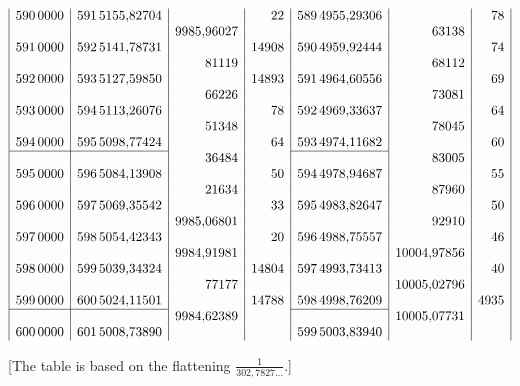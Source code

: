 {\[\begin{array}{|r|r|r|r|r|r|r|}
590\,0000&591\,5155{,}82704&&22&589\,4955{,}29306&&78\\
&&9985{,}96027&&&63138&\\
591\,0000&592\,5141{,}78731&&14908&590\,4959{,}92444&&74\\
&&81119&&&68112&\\
592\,0000&593\,5127{,}59850&&14893&591\,4964{,}60556&&69\\
&&66226&&&73081&\\
593\,0000&594\,5113{,}26076&&78&592\,4969{,}33637&&64\\
&&51348&&&78045&\\
594\,0000&595\,5098{,}77424&&64&593\,4974{,}11682&&60\\
\cline{1-2}\cline{5-5}
&&36484&&&83005&\\
595\,0000&596\,5084{,}13908&&50&594\,4978{,}94687&&55\\
&&21634&&&87960&\\
596\,0000&597\,5069{,}35542&&33&595\,4983{,}82647&&50\\
&&9985{,}06801&&&92910&\\
597\,0000&598\,5054{,}42343&&20&596\,4988{,}75557&&46\\
&&9984{,}91981&&&10004{,}97856&\\
598\,0000&599\,5039{,}34324&&14804&597\,4993{,}73413&&40\\
&&77177&&&10005{,}02796&\\
599\,0000&600\,5024{,}11501&&14788&598\,4998{,}76209&&4935\\
\cline{1-2}\cline{5-5}
&&9984{,}62389&&&10005{,}07731&\\
600\,0000&601\,5008{,}73890&&&599\,5003{,}83940&&\\
\end{array}\]
}
\begin{center}[The table is based on the flattening \(\frac1{302{,}7827\ldots}\).]\end{center}


